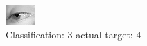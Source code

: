 \begin{figure}[h!]
\begin{center}
\includegraphics[width=0.60\columnwidth]{figures/ID2998_class_3_target_4.png}
\end{center}
\caption{ Classification: 3 actual target: 4}
\label{fig:ID2998_class_3_target_4}
\end{figure}

